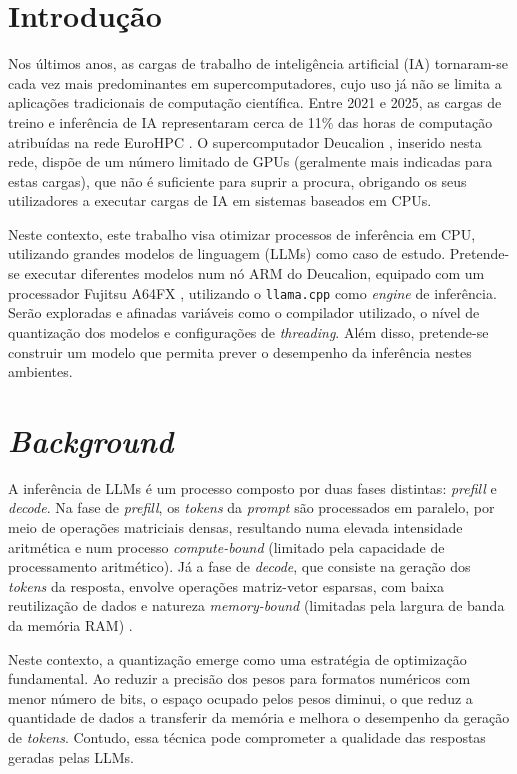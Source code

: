 \documentclass[11pt, a4paper]{article}
\begin{document}
\section{Introdução} %

Nos últimos anos, as cargas de trabalho de inteligência artificial (IA) tornaram-se cada vez mais
predominantes em supercomputadores, cujo uso já não se limita a aplicações tradicionais de
computação científica. Entre 2021 e 2025, as cargas de treino e inferência de IA representaram cerca
de 11\% das horas de computação atribuídas na rede EuroHPC \cite{eurohpc}. O supercomputador
Deucalion \cite{deucalion}, inserido nesta rede, dispõe de um número limitado de GPUs (geralmente
mais indicadas para estas cargas), que não é suficiente para suprir a procura, obrigando os seus
utilizadores a executar cargas de IA em sistemas baseados em CPUs.

Neste contexto, este trabalho visa otimizar processos de inferência em CPU, utilizando grandes
modelos de linguagem (LLMs) como caso de estudo. Pretende-se executar diferentes modelos num nó ARM
do Deucalion, equipado com um processador Fujitsu A64FX \cite{a64fx}, utilizando o
\texttt{llama.cpp} \cite{llama.cpp} como \emph{engine} de inferência. Serão exploradas e afinadas
variáveis como o compilador utilizado, o nível de quantização dos modelos e configurações de
\emph{threading}. Além disso, pretende-se construir um modelo que permita prever o desempenho da
inferência nestes ambientes.

\section{\emph{Background}}

A inferência de LLMs é um processo composto por duas fases distintas: \emph{prefill} e
\emph{decode}. Na fase de \emph{prefill}, os \emph{tokens} da \emph{prompt} são processados em
paralelo, por meio de operações matriciais densas, resultando numa elevada intensidade aritmética e
num processo \emph{compute-bound} (limitado pela capacidade de processamento aritmético). Já a fase
de \emph{decode}, que consiste na geração dos \emph{tokens} da resposta, envolve operações
matriz-vetor esparsas, com baixa reutilização de dados e natureza \emph{memory-bound} (limitadas
pela largura de banda da memória RAM) \cite{memory-bound, disaggregated-prefill-decode}.

Neste contexto, a quantização emerge como uma estratégia de optimização fundamental. Ao reduzir a
precisão dos pesos para formatos numéricos com menor número de bits, o espaço ocupado pelos pesos
diminui, o que reduz a quantidade de dados a transferir da memória e melhora o desempenho da
geração de \emph{tokens}. Contudo, essa técnica pode comprometer a qualidade das respostas geradas
pelas LLMs.
\end{document}
